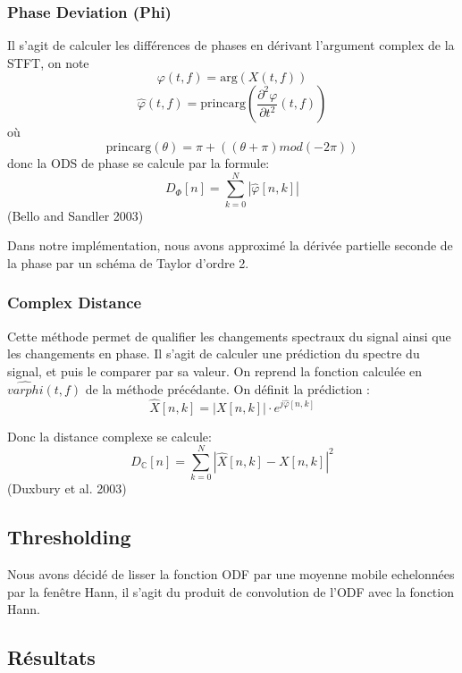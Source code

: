 \documentclass[]{article}
\begin{document}
\hypertarget{phase-deviation-phi}{%
\subsubsection{Phase Deviation (Phi)}\label{phase-deviation-phi}}

Il s'agit de calculer les différences de phases en dérivant l'argument
complex de la STFT, on note \[ \varphi(t, f) = \mathrm{arg}(X(t, f)) \]
\[\hat{\varphi}(t, f) = \mathrm{princarg}
\left( \frac{\partial^2 \varphi}{\partial t^2}(t, f)  \right) \] où
\[ \mathrm{princarg}(\theta) = \pi + ((\theta + \pi) mod (-2\pi)) \]
donc la ODS de phase se calcule par la formule:
\[ D_{\Phi}[n] = \sum\limits_{k=0}^{N}\left\lvert \hat{\varphi}[n, k] \right\rvert \]
(Bello and Sandler 2003)

Dans notre implémentation, nous avons approximé la dérivée partielle
seconde de la phase par un schéma de Taylor d'ordre 2.

\hypertarget{complex-distance}{%
\subsubsection{Complex Distance}\label{complex-distance}}

Cette méthode permet de qualifier les changements spectraux du signal
ainsi que les changements en phase. Il s'agit de calculer une prédiction
du spectre du signal, et puis le comparer par sa valeur. On reprend la
fonction calculée en \(\hat{varphi}(t, f)\) de la méthode précédante. On
définit la prédiction :
\[ \hat{X}[n, k] = \left\lvert X[n, k] \right\rvert \cdot e^{j\hat{\varphi}[n, k]} \]

Donc la distance complexe se calcule:
\[ D_{\mathbb{C}}[n] = \sum\limits_{k=0}^{N} \left\lvert  \hat{X}[n, k] - X[n, k] \right\rvert ^2 \]
(Duxbury et al. 2003)

\hypertarget{thresholding}{%
\subsection{Thresholding}\label{thresholding}}

Nous avons décidé de lisser la fonction ODF par une moyenne mobile
echelonnées par la fenêtre Hann, il s'agit du produit de convolution de
l'ODF avec la fonction Hann.

\hypertarget{resultats}{%
\subsection{Résultats}\label{resultats}}
\end{document}
